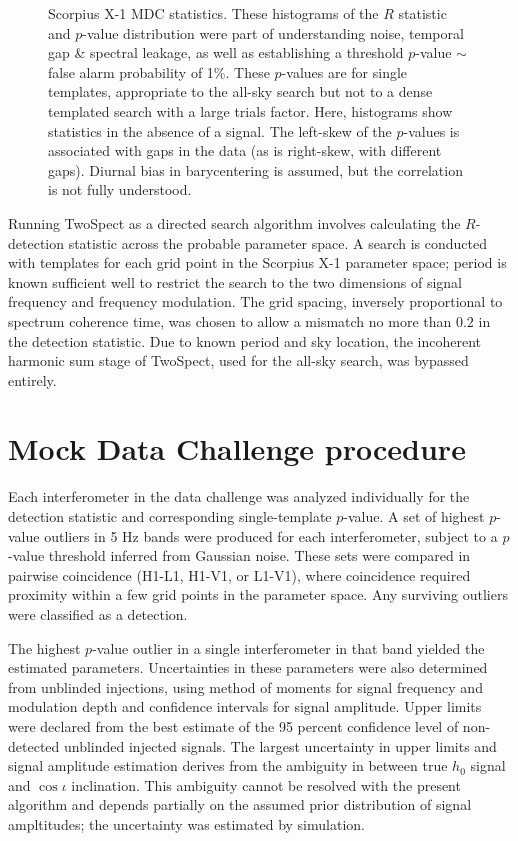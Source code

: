 \begin{figure}
\begin{center}
\caption{Scorpius X-1 MDC statistics. These histograms of the $R$ statistic and $p$-value distribution were part of understanding noise, temporal gap \& spectral leakage, as well as establishing a threshold $p$-value $\sim$ false alarm probability of 1\%.
These $p$-values are for single templates, appropriate to the all-sky search but not to a dense templated search with a large trials factor.
Here, histograms show statistics in the absence of a signal. 
The left-skew of the $p$-values is associated with gaps in the data (as is right-skew, with different gaps).
Diurnal bias in barycentering is assumed, but the correlation is not fully understood.
}
\end{center}
\end{figure}



Running TwoSpect as a directed search algorithm involves calculating
the $R$-detection statistic across the probable parameter space. 
A search is conducted with templates for each grid point in the Scorpius 
X-1 parameter space; period is known sufficient well to restrict the search
to the two dimensions of signal frequency and frequency modulation. The
grid spacing, inversely proportional to spectrum coherence time, was
chosen to allow a mismatch no more than $0.2$ in the detection statistic.
Due to known period and sky location, the incoherent harmonic sum stage
of TwoSpect, used for the all-sky search, was bypassed entirely. 

\section{Mock Data Challenge procedure}

Each interferometer in the data challenge was analyzed individually for 
the detection statistic and corresponding single-template $p$-value. A set
of highest $p$-value outliers in 5 Hz bands were produced for each 
interferometer, subject to a $p$-value threshold inferred from Gaussian noise.
These sets were compared in pairwise coincidence (H1-L1, H1-V1, or L1-V1),
where coincidence required proximity within a few grid points in the 
parameter space. Any surviving outliers were classified as a detection. 

The highest $p$-value outlier in a single interferometer in that band 
yielded the estimated parameters. Uncertainties in these parameters were also
determined from unblinded injections, using method of moments for signal
frequency and modulation depth and confidence intervals for signal
amplitude. Upper limits were declared from the best estimate of the 95
percent confidence level of non-detected unblinded injected signals. The
largest uncertainty in upper limits and signal amplitude estimation derives
from the ambiguity in between true $h_0$ signal and $\cos \iota$ inclination.
This ambiguity cannot be resolved with the present algorithm and depends
partially on the assumed prior distribution of signal ampltitudes; the
uncertainty was estimated by simulation.

